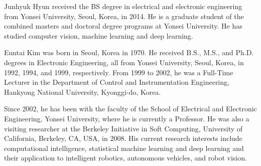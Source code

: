 \documentclass[journal,comsoc]{IEEEtran}
\begin{document}
\begin{IEEEbiography}{Junhyuk Hyun} received the BS degree in electrical and electronic engineering from Yonsei University, Seoul, Korea, in 2014. He is a graduate student of the combined masters and doctoral degree programs at Yonsei University. He has studied computer vision, machine learning and deep learning.
\end{IEEEbiography}

\begin{IEEEbiography}{Euntai Kim} was born in Seoul, Korea in 1970. He received B.S., M.S., and Ph.D. degrees in Electronic Engineering, all from Yonsei University, Seoul, Korea, in 1992, 1994, and 1999, respectively. From 1999 to 2002, he was a Full-Time Lecturer in the Department of Control and Instrumentation Engineering, Hankyong National University, Kyonggi-do, Korea.

Since 2002, he has been with the faculty of the School of Electrical and Electronic Engineering, Yonsei University, where he is currently a Professor. He was also a visiting researcher at the Berkeley Initiative in Soft Computing, University of California, Berkeley, CA, USA, in 2008. His current research interests include computational intelligence, statistical machine learning and deep learning and their application to intelligent robotics, autonomous vehicles, and robot vision.
\end{IEEEbiography}
\end{document}
